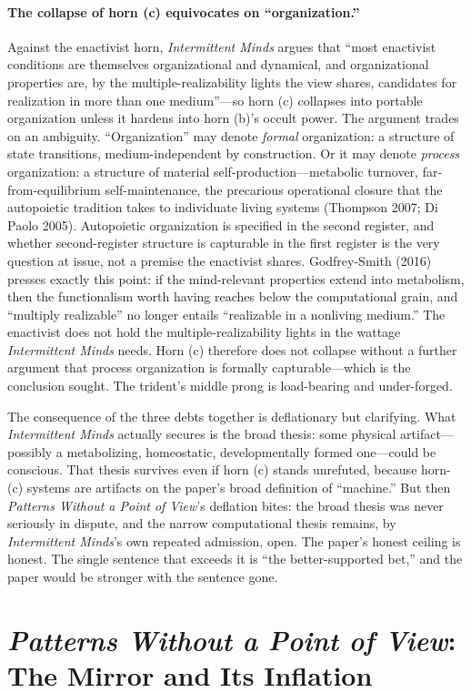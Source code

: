 \documentclass[11pt]{article}
\newcommand{\IM}{\emph{Intermittent Minds}}
\newcommand{\PP}{\emph{Patterns Without a Point of View}}
\begin{document}
\paragraph{The collapse of horn (c) equivocates on ``organization.''} Against the enactivist horn, \IM{} argues that ``most enactivist conditions are themselves organizational and dynamical, and organizational properties are, by the multiple-realizability lights the view shares, candidates for realization in more than one medium''---so horn (c) collapses into portable organization unless it hardens into horn (b)'s occult power. The argument trades on an ambiguity. ``Organization'' may denote \emph{formal} organization: a structure of state transitions, medium-independent by construction. Or it may denote \emph{process} organization: a structure of material self-production---metabolic turnover, far-from-equilibrium self-maintenance, the precarious operational closure that the autopoietic tradition takes to individuate living systems (Thompson 2007; Di Paolo 2005). Autopoietic organization is specified in the second register, and whether second-register structure is capturable in the first register is the very question at issue, not a premise the enactivist shares. Godfrey-Smith (2016) presses exactly this point: if the mind-relevant properties extend into metabolism, then the functionalism worth having reaches below the computational grain, and ``multiply realizable'' no longer entails ``realizable in a nonliving medium.'' The enactivist does not hold the multiple-realizability lights in the wattage \IM{} needs. Horn (c) therefore does not collapse without a further argument that process organization is formally capturable---which is the conclusion sought. The trident's middle prong is load-bearing and under-forged.

The consequence of the three debts together is deflationary but clarifying. What \IM{} actually secures is the broad thesis: some physical artifact---possibly a metabolizing, homeostatic, developmentally formed one---could be conscious. That thesis survives even if horn (c) stands unrefuted, because horn-(c) systems are artifacts on the paper's broad definition of ``machine.'' But then \PP{}'s deflation bites: the broad thesis was never seriously in dispute, and the narrow computational thesis remains, by \IM{}'s own repeated admission, open. The paper's honest ceiling is honest. The single sentence that exceeds it is ``the better-supported bet,'' and the paper would be stronger with the sentence gone.

\section{\PP{}: The Mirror and Its Inflation}
\end{document}
